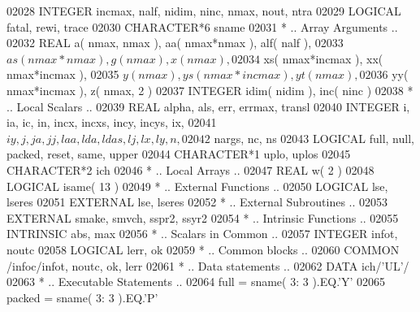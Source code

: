 \begin{DoxyCode}
02028       \textcolor{keywordtype}{INTEGER}            incmax, nalf, nidim, ninc, nmax, nout, ntra
02029       \textcolor{keywordtype}{LOGICAL}            fatal, rewi, trace
02030       \textcolor{keywordtype}{CHARACTER*6}        sname
02031 \textcolor{comment}{*     .. Array Arguments ..}
02032       \textcolor{keywordtype}{REAL}               a( nmax, nmax ), aa( nmax*nmax ), alf( nalf ),
02033      $                   as( nmax*nmax ), g( nmax ), x( nmax ),
02034      $                   xs( nmax*incmax ), xx( nmax*incmax ),
02035      $                   y( nmax ), ys( nmax*incmax ), yt( nmax ),
02036      $                   yy( nmax*incmax ), z( nmax, 2 )
02037       \textcolor{keywordtype}{INTEGER}            idim( nidim ), inc( ninc )
02038 \textcolor{comment}{*     .. Local Scalars ..}
02039       \textcolor{keywordtype}{REAL}               alpha, als, err, errmax, transl
02040       \textcolor{keywordtype}{INTEGER}            i, ia, ic, in, incx, incxs, incy, incys, ix,
02041      $                   iy, j, ja, jj, laa, lda, ldas, lj, lx, ly, n,
02042      $                   nargs, nc, ns
02043       \textcolor{keywordtype}{LOGICAL}            full, null, packed, reset, same, upper
02044       \textcolor{keywordtype}{CHARACTER*1}        uplo, uplos
02045       \textcolor{keywordtype}{CHARACTER*2}        ich
02046 \textcolor{comment}{*     .. Local Arrays ..}
02047       \textcolor{keywordtype}{REAL}               w( 2 )
02048       \textcolor{keywordtype}{LOGICAL}            isame( 13 )
02049 \textcolor{comment}{*     .. External Functions ..}
02050       \textcolor{keywordtype}{LOGICAL}            lse, lseres
02051       \textcolor{keywordtype}{EXTERNAL}           lse, lseres
02052 \textcolor{comment}{*     .. External Subroutines ..}
02053       \textcolor{keywordtype}{EXTERNAL}           smake, smvch, sspr2, ssyr2
02054 \textcolor{comment}{*     .. Intrinsic Functions ..}
02055       \textcolor{keywordtype}{INTRINSIC}          abs, max
02056 \textcolor{comment}{*     .. Scalars in Common ..}
02057       \textcolor{keywordtype}{INTEGER}            infot, noutc
02058       \textcolor{keywordtype}{LOGICAL}            lerr, ok
02059 \textcolor{comment}{*     .. Common blocks ..}
02060       \textcolor{keyword}{COMMON}             /infoc/infot, noutc, ok, lerr
02061 \textcolor{comment}{*     .. Data statements ..}
02062       \textcolor{keyword}{DATA}               ich/\textcolor{stringliteral}{'UL'}/
02063 \textcolor{comment}{*     .. Executable Statements ..}
02064       full = sname( 3: 3 ).EQ.\textcolor{stringliteral}{'Y'}
02065       packed = sname( 3: 3 ).EQ.\textcolor{stringliteral}{'P'}

\end{DoxyCode}
